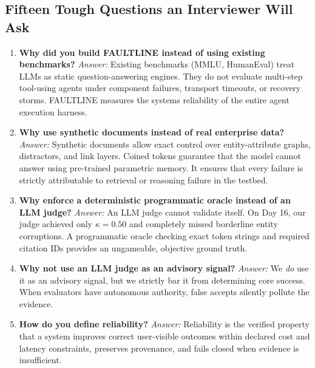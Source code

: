 \subsection{Fifteen Tough Questions an Interviewer Will Ask}

\begin{enumerate}
    \item \textbf{Why did you build FAULTLINE instead of using existing benchmarks?}
    \newline \textit{Answer:} Existing benchmarks (MMLU, HumanEval) treat LLMs as static question-answering engines. They do not evaluate multi-step tool-using agents under component failures, transport timeouts, or recovery storms. FAULTLINE measures the systems reliability of the entire agent execution harness.

    \item \textbf{Why use synthetic documents instead of real enterprise data?}
    \newline \textit{Answer:} Synthetic documents allow exact control over entity-attribute graphs, distractors, and link layers. Coined tokens guarantee that the model cannot answer using pre-trained parametric memory. It ensures that every failure is strictly attributable to retrieval or reasoning failure in the testbed.

    \item \textbf{Why enforce a deterministic programmatic oracle instead of an LLM judge?}
    \newline \textit{Answer:} An LLM judge cannot validate itself. On Day 16, our judge achieved only $\kappa=0.50$ and completely missed borderline entity corruptions. A programmatic oracle checking exact token strings and required citation IDs provides an ungameable, objective ground truth.

    \item \textbf{Why not use an LLM judge as an advisory signal?}
    \newline \textit{Answer:} We \textit{do} use it as an advisory signal, but we strictly bar it from determining core success. When evaluators have autonomous authority, false accepts silently pollute the evidence.

    \item \textbf{How do you define reliability?}
    \newline \textit{Answer:} Reliability is the verified property that a system improves correct user-visible outcomes within declared cost and latency constraints, preserves provenance, and fails closed when evidence is insufficient.


\end{enumerate}
